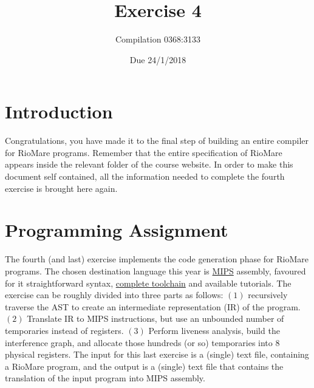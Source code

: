 \documentclass{article}
\begin{document}
\title{Exercise 4}

\author{Compilation 0368:3133}

\date{Due 24/1/2018}

\maketitle

\section{Introduction}
Congratulations, you have made it to the final step of
building an entire compiler for RioMare programs.
Remember that the entire specification of RioMare appears
inside the relevant folder of the course website.
In order to make this document self contained,
all the information needed to complete the fourth exercise is brought here again.

\section{Programming Assignment}
The fourth (and last) exercise implements the code generation phase for RioMare programs.
The chosen destination language this year is \href{https://en.wikipedia.org/wiki/MIPS_architecture}{MIPS}
assembly, favoured for it straightforward syntax,
\href{https://en.wikipedia.org/wiki/SPIM}{complete toolchain}
and available tutorials.
The exercise can be roughly divided into three parts as follows:
$(1)$ recursively traverse the AST to create
an intermediate representation (IR) of the program.
$(2)$ Translate IR to MIPS instructions,
but use an unbounded number of temporaries instead of registers.
$(3)$ Perform liveness analysis, build the interference graph,
and allocate those hundreds (or so) temporaries into $8$ physical registers.
The input for this last exercise is a (single) text file, containing a RioMare
program, and the output is a (single) text file that contains the translation
of the input program into MIPS assembly.
\end{document}

